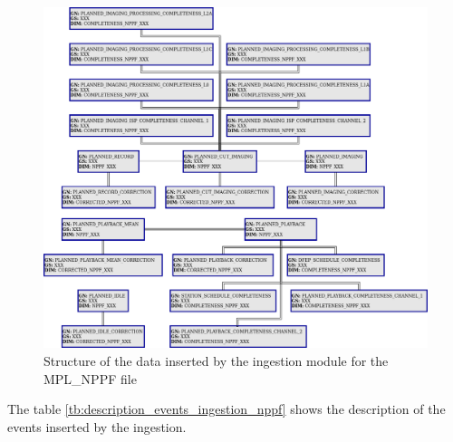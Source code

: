 \begin{figure}[H]
  \begin{center}
	\centering\includegraphics[width=150mm]{../fig/structure_ingestion_nppf.png}
	\caption{Structure of the data inserted by the ingestion module for the MPL\_NPPF file}
	\label{fg:structure_ingestion_nppf}
  \end{center}
\end{figure}

The table \ref{tb:description_events_ingestion_nppf} shows the description of the events inserted by the ingestion.

